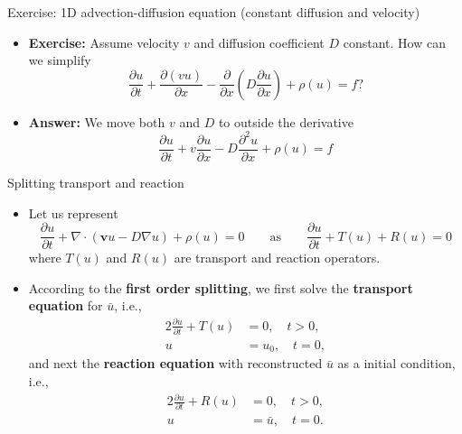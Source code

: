 %
%
\begin{frame}{Exercise: 1D advection-diffusion equation (constant diffusion and velocity)}
\begin{itemize}
\item \textbf{Exercise:} Assume velocity $v$ and diffusion coefficient
$D$ constant. How can we simplify
\[
\frac{\partial u}{\partial t}+\frac{\partial(vu)}{\partial x}-\frac{\partial}{\partial x}\left(D\frac{\partial u}{\partial x}\right)+ \rho (u) =f?
\]
\hiddenpause
\item \textbf{Answer:} We move both $v$ and $D$ to outside the derivative
\[
\frac{\partial u}{\partial t}+v\frac{\partial u}{\partial x}-D\frac{\partial^{2}u}{\partial x}+ \rho (u) =f
\]
\end{itemize}
\end{frame}
%
%
\begin{frame}{Splitting transport and reaction}
	\begin{itemize}
		\item Let us represent 
		\[\frac{\partial u}{\partial t}+\nabla\cdot(\boldsymbol{v}u-D\nabla u)  + \rho (u) = 0 \qquad \text{as} \qquad \frac{\partial u}{\partial t}+T(u) + R(u) = 0\] 
		where $T(u)$ and $R(u)$ are transport and reaction operators.
		\item According to the \alert{\bf first order splitting}, we first solve the {\bf transport equation} for $\bar{u}$, i.e., 
		\begin{alignat*}{2}
		\frac{\partial u}{\partial t}+T(u) & = 0, \quad  t > 0, \\[-5pt]
		u &= u_0, \quad  t = 0, 
		\end{alignat*}
		and next the {\bf reaction equation} with reconstructed $\bar{u}$ as a initial condition, i.e.,  
		\begin{alignat*}{2}
			\frac{\partial u}{\partial t}+R(u) & = 0, \quad  t > 0, \\[-5pt]
			u & = \bar{u}, \quad  t = 0. 
		\end{alignat*}
	\end{itemize}
\end{frame}
